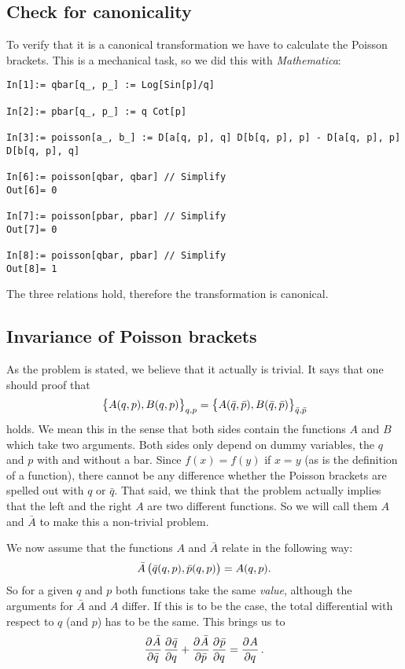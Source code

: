 \documentclass[11pt, ngerman, fleqn, DIV=15, headinclude, BCOR=1cm]{scrartcl}
\begin{document}
\subsection{Check for canonicality}

To verify that it is a canonical transformation we have to calculate the
Poisson brackets. This is a mechanical task, so we did this with
\emph{Mathematica}:

\begin{verbatim}
In[1]:= qbar[q_, p_] := Log[Sin[p]/q]

In[2]:= pbar[q_, p_] := q Cot[p]

In[3]:= poisson[a_, b_] := D[a[q, p], q] D[b[q, p], p] - D[a[q, p], p] D[b[q, p], q]

In[6]:= poisson[qbar, qbar] // Simplify
Out[6]= 0

In[7]:= poisson[pbar, pbar] // Simplify
Out[7]= 0

In[8]:= poisson[qbar, pbar] // Simplify
Out[8]= 1
\end{verbatim}

The three relations hold, therefore the transformation is canonical.

\subsection{Invariance of Poisson brackets}
\label{sec:invar_poisson}

As the problem is stated, we believe that it actually is trivial. It says that
one should proof that
\[
    \cbr{A(q, p), B(q, p)}_{q,p} = \cbr{A(\bar q, \bar p), B(\bar q, \bar
    p)}_{\bar q,\bar p}
\]
holds. We mean this in the sense that both sides contain the functions $A$ and
$B$ which take two arguments. Both sides only depend on dummy variables, the
$q$ and $p$ with and without a bar. Since $f(x) = f(y)$ if $x = y$ (as is the
definition of a function), there cannot be any difference whether the Poisson
brackets are spelled out with $q$ or $\bar q$. That said, we think that the
problem actually implies that the left and the right $A$ are two different
functions. So we will call them $A$ and $\bar A$ to make this a non-trivial
problem.

We now assume that the functions $A$ and $\bar A$ relate in the following way:
\[
    \bar A\del{\bar q(q, p), \bar p(q, p)} = A(q, p).
\]
So for a given $q$ and $p$ both functions take the same \emph{value}, although
the arguments for $\bar A$ and $A$ differ. If this is to be the case, the total
differential with respect to $q$ (and $p$) has to be the same. This brings us
to
\[
    \dpd{\bar A}{\bar q} \dpd{\bar q}q + \dpd{\bar A}{\bar p} \dpd{\bar p}q =
    \dpd Aq.
\]
\end{document}

